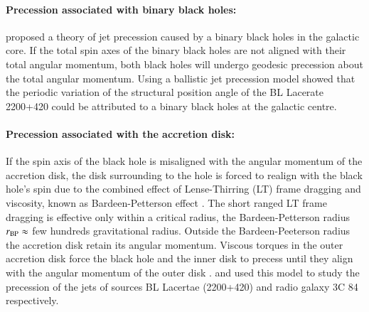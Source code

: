 \paragraph{Precession associated with binary black holes:}
\citet{begelman80} proposed a theory of jet precession caused by a binary black holes in the galactic core.  If the total spin axes of the binary black holes are not aligned with their total angular momentum, both black holes will undergo geodesic precession about the total angular momentum. Using a ballistic jet precession model \citep{caproni13} showed that the periodic variation of the structural position angle of the BL Lacerate 2200+420 could be attributed to a binary black holes at the galactic centre. 

\paragraph{Precession associated with the accretion disk:}
If the spin axis of the black hole is misaligned with the angular momentum of the accretion disk, the disk surrounding to the hole is forced to realign with the black hole's spin due to the combined effect of Lense-Thirring (LT) frame dragging and viscosity, known as  Bardeen-Petterson effect \citep{bardeen75}. The short ranged LT frame dragging is effective only within a critical radius, the Bardeen-Petterson radius $r_{\rm BP}\approx$ few hundreds gravitational radius. Outside the Bardeen-Peeterson radius the accretion disk retain its angular momentum. Viscous torques in the outer accretion disk force the black hole and the inner disk to precess until they align with the angular momentum of the outer disk \citep{rees78, scheuer96, natarajan98, caproni07}. \citet{caproni07} and \citet{morales-teixeira12} used this model to study the precession of the jets of sources BL Lacertae (2200+420) and radio galaxy 3C 84 respectively. 

